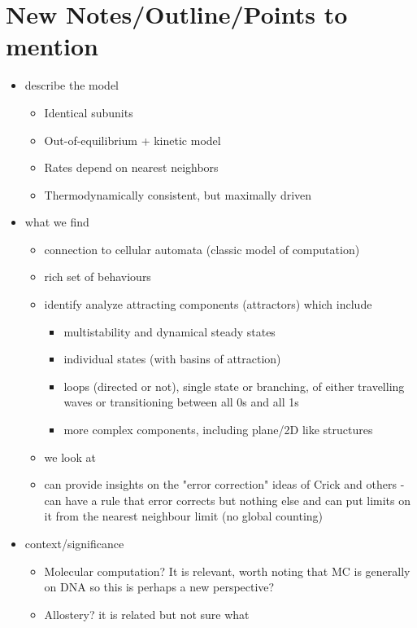 \documentclass[11pt]{article}
\begin{document}

\vspace{5em}
\section{New Notes/Outline/Points to mention}
\begin{itemize}
	\item describe the model
	      \begin{itemize}
		      \item Identical subunits
		      \item Out-of-equilibrium + kinetic model
		      \item Rates depend on nearest neighbors
		      \item Thermodynamically consistent, but maximally driven
	      \end{itemize}
	\item what we find
	      \begin{itemize}
		      \item connection to cellular automata (classic model of computation)
		      \item rich set of behaviours
		      \item identify analyze attracting components (attractors) which include
		            \begin{itemize}
			            \item multistability and dynamical steady states
			            \item individual states (with basins of attraction)
			            \item loops (directed or not), single state or branching, of either travelling waves or transitioning between all 0s and all 1s
			            \item more complex components, including plane/2D like structures
		            \end{itemize}
		      \item we look at
		      \item can provide insights on the "error correction" ideas of Crick and others - can have a rule that error corrects but nothing else and can put limits on it from the nearest neighbour limit (no global counting)
	      \end{itemize}
	\item context/significance
	      \begin{itemize}
		      \item Molecular computation? It is relevant, worth noting that MC is generally on DNA so this is perhaps a new perspective?
		      \item Allostery? it is related but not sure what
	      \end{itemize}
\end{itemize}
\end{document}

